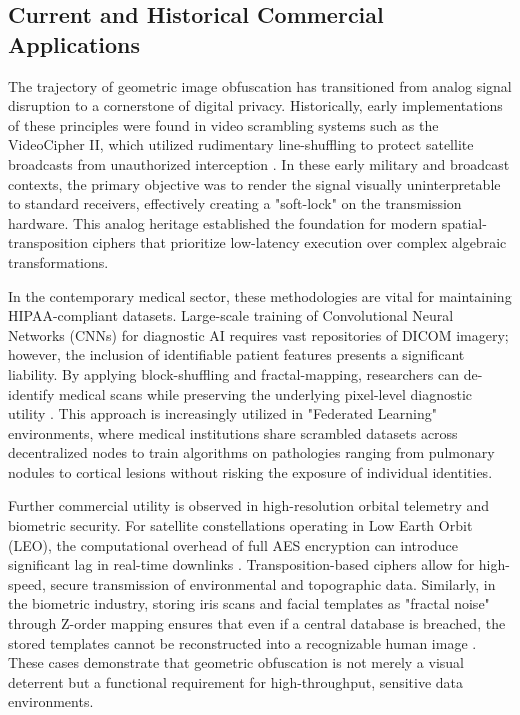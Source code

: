\documentclass[12pt,fleqn]{article}
\begin{document}
\subsection{Current and Historical Commercial Applications}

The trajectory of geometric image obfuscation has transitioned from analog signal disruption to a cornerstone of digital privacy. Historically, early implementations of these principles were found in video scrambling systems such as the VideoCipher II, which utilized rudimentary line-shuffling to protect satellite broadcasts from unauthorized interception \cite{schneier2007applied}. In these early military and broadcast contexts, the primary objective was to render the signal visually uninterpretable to standard receivers, effectively creating a "soft-lock" on the transmission hardware. This analog heritage established the foundation for modern spatial-transposition ciphers that prioritize low-latency execution over complex algebraic transformations.

In the contemporary medical sector, these methodologies are vital for maintaining HIPAA-compliant datasets. Large-scale training of Convolutional Neural Networks (CNNs) for diagnostic AI requires vast repositories of DICOM imagery; however, the inclusion of identifiable patient features presents a significant liability. By applying block-shuffling and fractal-mapping, researchers can de-identify medical scans while preserving the underlying pixel-level diagnostic utility \cite{zhou2015image}. This approach is increasingly utilized in "Federated Learning" environments, where medical institutions share scrambled datasets across decentralized nodes to train algorithms on pathologies ranging from pulmonary nodules to cortical lesions without risking the exposure of individual identities.

Further commercial utility is observed in high-resolution orbital telemetry and biometric security. For satellite constellations operating in Low Earth Orbit (LEO), the computational overhead of full AES encryption can introduce significant lag in real-time downlinks \cite{cook2005gpu}. Transposition-based ciphers allow for high-speed, secure transmission of environmental and topographic data. Similarly, in the biometric industry, storing iris scans and facial templates as "fractal noise" through Z-order mapping ensures that even if a central database is breached, the stored templates cannot be reconstructed into a recognizable human image \cite{bourbakis1992image}. These cases demonstrate that geometric obfuscation is not merely a visual deterrent but a functional requirement for high-throughput, sensitive data environments.
\end{document}
